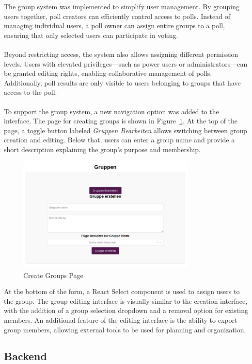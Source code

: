 \documentclass[a4paper,12pt]{report}
\begin{document}
The group system was implemented to simplify user management. By grouping users together, poll creators can efficiently control access to polls. Instead of managing individual users, a poll owner can assign entire groups to a poll, ensuring that only selected users can participate in voting. \\ \\
Beyond restricting access, the system also allows assigning different permission levels. Users with elevated privileges—such as power users or administrators—can be granted editing rights, enabling collaborative management of polls. Additionally, poll results are only visible to users belonging to groups that have access to the poll. \\ \\
To support the group system, a new navigation option was added to the interface. The page for creating groups is shown in Figure~\ref{fig:create_groups}. At the top of the page, a toggle button labeled \textit{Gruppen Bearbeiten} allows switching between group creation and editing. Below that, users can enter a group name and provide a short description explaining the group's purpose and membership.
\begin{figure}[H]
	\centering
	\includegraphics[width=0.8\textwidth]{pics/create_groups.png}
	\caption{Create Groups Page}
	\label{fig:create_groups}
\end{figure}
At the bottom of the form, a React Select component is used to assign users to the group. The group editing interface is visually similar to the creation interface, with the addition of a group selection dropdown and a removal option for existing members. An additional feature of the editing interface is the ability to export group members, allowing external tools to be used for planning and organization.

\subsection{Backend}
\end{document}
